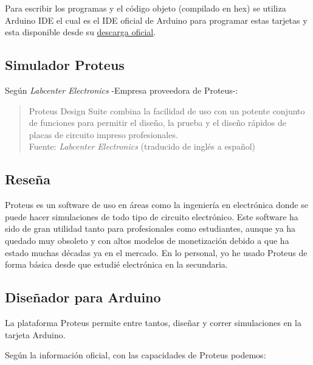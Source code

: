 \documentclass{article}
\begin{document}
    Para escribir los programas y el código objeto (compilado en hex) se
    utiliza Arduino IDE el cual es el IDE oficial de Arduino para programar
    estas tarjetas y esta disponible desde su \href{https://docs.arduino
.cc/software/ide-v2/tutorials/getting-started/ide-v2-downloading-and
-installing}{descarga oficial}.

    \subsection{Simulador Proteus}

    Según \textit{Labcenter Electronics}\cite{labcenter-electronics-2022}
    -Empresa proveedora de Proteus-:

    \begin{quote}
        Proteus Design Suite combina la facilidad de uso con un potente
        conjunto de funciones para permitir el diseño, la prueba y el diseño
        rápidos de placas de circuito impreso profesionales.\\ \footnotesize
        Fuente: \textit{Labcenter Electronics} (traducido de inglés a
        español) \cite{labcenter-electronics-2022}
    \end{quote}

    \subsection{Reseña}

    Proteus es un software de uso en áreas como la ingeniería en electrónica
    donde se puede hacer simulaciones de todo tipo de circuito electrónico.
    Este software ha sido de gran utilidad tanto para profesionales como
    estudiantes, aunque ya ha quedado muy obsoleto y con altos modelos de
    monetización debido a que ha estado muchas décadas ya en el mercado. En
    lo personal, yo he usado Proteus de forma básica desde que estudié
    electrónica en la secundaria.

    \subsection{Diseñador para Arduino}

    La plataforma Proteus permite entre tantos, diseñar y correr simulaciones
    en la tarjeta Arduino.

    \bigbreak

    Según la información oficial, con las capacidades de Proteus podemos:
\end{document}
